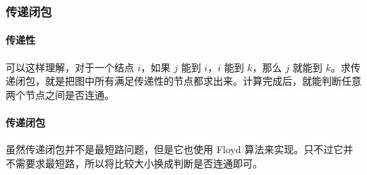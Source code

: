\subsubsection{传递闭包}
	\paragraph{传递性} 可以这样理解，对于一个结点 $i$，如果 $j$ 能到 $i$，$i$ 能到 $k$，那么 $j$ 就能到 $k$。求传递闭包，就是把图中所有满足传递性的节点都求出来。计算完成后，就能判断任意两个节点之间是否连通。 
	
	\paragraph{传递闭包} 虽然传递闭包并不是最短路问题，但是它也使用 Floyd 算法来实现。只不过它并不需要求最短路，所以将比较大小换成判断是否连通即可。